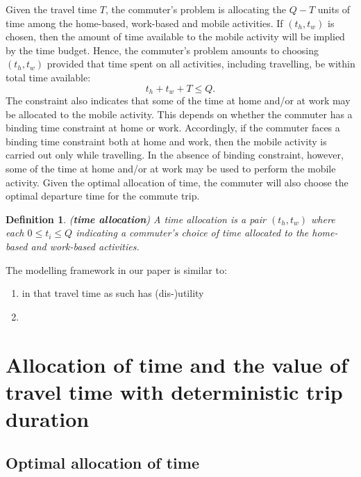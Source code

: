 \documentclass[12pt,a4paper,british]{article}
\newtheorem{definition}{Definition}[section]
\begin{document}
Given the travel time $T$, the commuter's problem is allocating the $Q-T$ units of time among the home-based, work-based and mobile activities. If $\left(t_{h},t_{w}\right)$ is chosen, then the amount of time available to the mobile activity will be implied by the time budget. Hence, the commuter's problem amounts to choosing $\left(t_{h},t_{w}\right)$ provided that time spent on all activities, including travelling, be within total time available:  
\begin{equation}
t_{h}+t_{w}+T\leq Q.
\label{constraint0}
\end{equation}
The constraint also indicates that some of the time at home and/or at work may be allocated to the mobile activity. This depends on whether the commuter has a binding time constraint at home or work. Accordingly, if the commuter faces a binding time constraint both at home and work, then the mobile activity is carried out only while travelling. In the absence of binding constraint, however, some of the time at home and/or at work may be used to perform the mobile activity. Given the optimal allocation of time, the commuter will also choose the optimal departure time for the commute trip.


\begin{definition}
(\textbf{time allocation}) A time allocation is a pair $\left(t_{h},t_{w}\right)$ where each $0\leq t_{i}\leq Q$ indicating a commuter's choice of time allocated to the home-based and work-based activities.
\end{definition}

The modelling framework in our paper is similar to:
\begin{enumerate}
    \item \citeauthor{Oort1969EvaluationTravellingTime} in that travel time as such has (dis-)utility
    \item \citet{DeSerpa1971TheoryEconomicsTime}
\end{enumerate}

\section{Allocation of time and the value of travel time with deterministic trip duration}

\subsection*{Optimal allocation of time}
\end{document}

